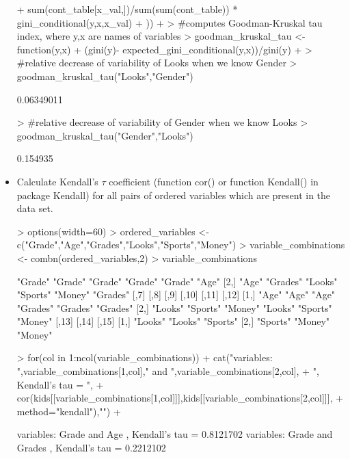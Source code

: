 \documentclass[a4paper]{article}
\begin{document}
\begin{itemize}
\begin{Schunk}
\begin{Sinput}
{{+      sum(cont_table[x_val,])/sum(sum(cont_table)) * gini_conditional(y,x,x_val)  
+   }))
+ }
> #computes Goodman-Kruskal tau index, where y,x are names of variables
> goodman_kruskal_tau <- function(y,x){
+   (gini(y)- expected_gini_conditional(y,x))/gini(y)
+ }
> #relative decrease of variability of Looks when we know Gender
> goodman_kruskal_tau("Looks","Gender")
\end{Sinput}
\begin{Soutput}
[1] 0.06349011
\end{Soutput}
\begin{Sinput}
> #relative decrease of variability of Gender when we know Looks
> goodman_kruskal_tau("Gender","Looks")
\end{Sinput}
\begin{Soutput}
[1] 0.154935
\end{Soutput}
\end{Schunk}
\item Calculate Kendall's $\tau$ coefficient (function cor() or function Kendall() in package Kendall) for all pairs of ordered variables which are present in the data set.
\begin{Schunk}
\begin{Sinput}
> options(width=60)
> ordered_variables <- c("Grade","Age","Grades","Looks","Sports","Money")
> variable_combinations <- combn(ordered_variables,2)
> variable_combinations
\end{Sinput}
\begin{Soutput}
     [,1]    [,2]     [,3]    [,4]     [,5]    [,6]    
[1,] "Grade" "Grade"  "Grade" "Grade"  "Grade" "Age"   
[2,] "Age"   "Grades" "Looks" "Sports" "Money" "Grades"
     [,7]    [,8]     [,9]    [,10]    [,11]    [,12]   
[1,] "Age"   "Age"    "Age"   "Grades" "Grades" "Grades"
[2,] "Looks" "Sports" "Money" "Looks"  "Sports" "Money" 
     [,13]    [,14]   [,15]   
[1,] "Looks"  "Looks" "Sports"
[2,] "Sports" "Money" "Money" 
\end{Soutput}
\begin{Sinput}
> for(col in 1:ncol(variable_combinations)){
+   cat("variables: ",variable_combinations[1,col]," and ",variable_combinations[2,col],
+       ", Kendall's tau = ",
+       cor(kids[[variable_combinations[1,col]]],kids[[variable_combinations[2,col]]], 
+           method="kendall"),"\n")
+ }
\end{Sinput}
\begin{Soutput}
variables:  Grade  and  Age , Kendall's tau =  0.8121702 
variables:  Grade  and  Grades , Kendall's tau =  0.2212102 

\end{Soutput}
\end{Schunk}
\end{itemize}
\end{document}
